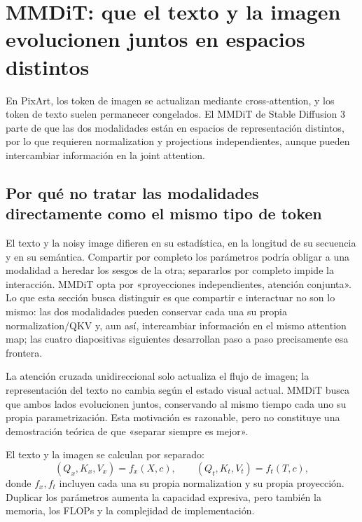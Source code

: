 \section{MMDiT: que el texto y la imagen evolucionen juntos en espacios distintos}

En PixArt, los token de imagen se actualizan mediante cross-attention, y los token de texto suelen permanecer congelados. El MMDiT de Stable Diffusion 3 parte de que las dos modalidades están en espacios de representación distintos, por lo que requieren normalization y projections independientes, aunque pueden intercambiar información en la joint attention.

\subsection{Por qué no tratar las modalidades directamente como el mismo tipo de token}

El texto y la noisy image difieren en su estadística, en la longitud de su secuencia y en su semántica. Compartir por completo los parámetros podría obligar a una modalidad a heredar los sesgos de la otra; separarlos por completo impide la interacción. MMDiT opta por «proyecciones independientes, atención conjunta». Lo que esta sección busca distinguir es que compartir e interactuar no son lo mismo: las dos modalidades pueden conservar cada una su propia normalization/QKV y, aun así, intercambiar información en el mismo attention map; las cuatro diapositivas siguientes desarrollan paso a paso precisamente esa frontera.


La atención cruzada unidireccional solo actualiza el flujo de imagen; la representación del texto no cambia según el estado visual actual. MMDiT busca que ambos lados evolucionen juntos, conservando al mismo tiempo cada uno su propia parametrización. Esta motivación es razonable, pero no constituye una demostración teórica de que «separar siempre es mejor».


El texto y la imagen se calculan por separado:
\[
(Q_x,K_x,V_x)=f_x(X,c),\qquad
(Q_t,K_t,V_t)=f_t(T,c),
\]
donde $f_x,f_t$ incluyen cada una su propia normalization y su propia proyección. Duplicar los parámetros aumenta la capacidad expresiva, pero también la memoria, los FLOPs y la complejidad de implementación.

